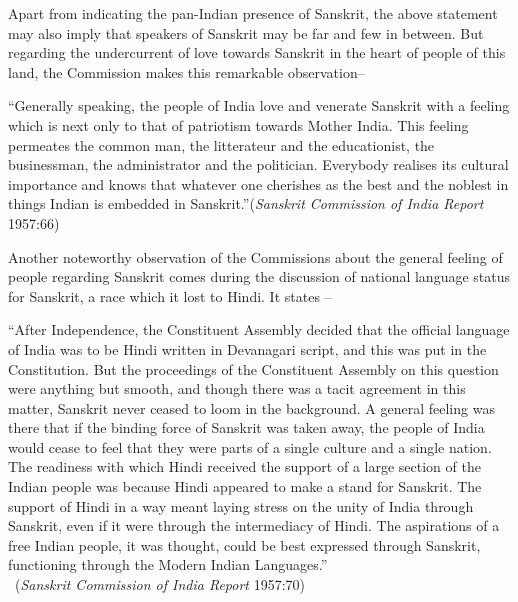 Apart from indicating the pan-Indian presence of Sanskrit, the above statement may also imply that speakers of Sanskrit may be far and few in between. But regarding the undercurrent of love towards Sanskrit in the heart of people of this land, the Commission makes this remarkable observation–
\begin{myquote}
\eleven
“Generally speaking, the people of India love and venerate Sanskrit with a feeling which is next only to that of patriotism towards Mother India. This feeling permeates the common man, the litterateur and the educationist, the businessman, the administrator and the politician. Everybody realises its cultural importance and knows that whatever one cherishes as the best and the noblest in things Indian is embedded in Sanskrit.”\hfill ({\sl Sanskrit Commission of India Report} 1957:66)
\end{myquote}

Another noteworthy observation of the Commissions about the general feeling of people regarding Sanskrit comes during the discussion of national language status for Sanskrit, a race which it lost to Hindi. It states – 
\begin{myquote}
\eleven
“After Independence, the Constituent Assembly decided that the official language of India was to be Hindi written in Devanagari script, and this was put in the Constitution. But the proceedings of the Constituent Assembly on this question were anything but smooth, and though there was a tacit agreement in this matter, Sanskrit never ceased to loom in the background. A general feeling was there that if the binding force of Sanskrit was taken away, the people of India would cease to feel that they were parts of a single culture and a single nation. The readiness with which Hindi received the support of a large section of the Indian people was because Hindi appeared to make a stand for Sanskrit. The support of Hindi in a way meant laying stress on the unity of India through Sanskrit, even if it were through the intermediacy of Hindi. The aspirations of a free Indian people, it was thought, could be best expressed through Sanskrit, functioning through the Modern Indian Languages.”\\[-15pt] 

~\hfill ({\sl Sanskrit Commission of India Report} 1957:70)
\end{myquote}


